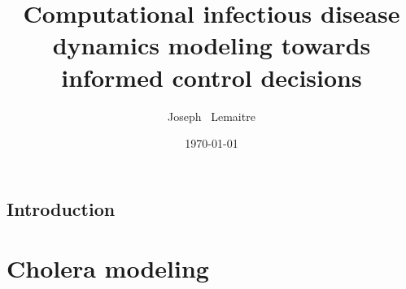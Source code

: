 \documentclass[nohyper,nobib,a4,12pt]{tufte-book} %
\title{Computational infectious disease dynamics modeling towards informed control decisions}
\date{\today}
\author[Joseph Lemaitre]{Joseph \ Lemaitre}
\newcommand{\openepigraph}[2]{%
  \begin{fullwidth}
  \sffamily\large
  \begin{doublespace}
  \noindent\allcaps{#1}\\%
  \noindent\allcaps{#2}%
  \end{doublespace}
  \end{fullwidth}
}
\newcommand{\blankpage}{\newpage\hbox{}\thispagestyle{empty}\newpage}
\begin{document}
\begin{fullwidth}
	
\frontmatter




\maketitle

\tableofcontents

\listoffigures

\listoftables


\end{fullwidth}
\chapter{Introduction}


\part{Cholera modeling}



\end{document}
